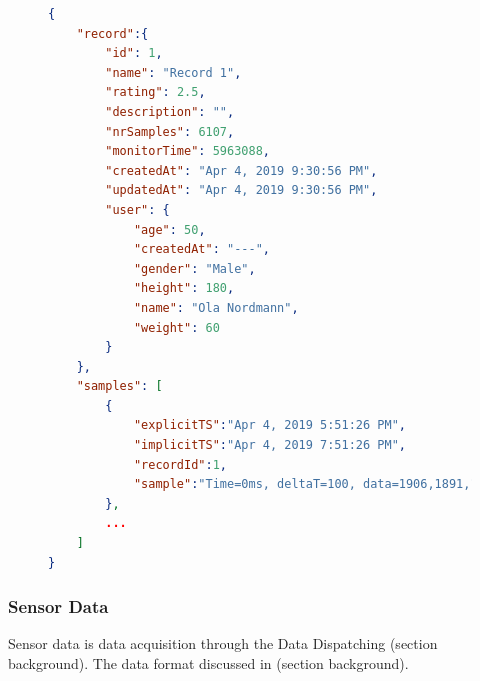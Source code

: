 \begin{figure}
    
\begin{lstlisting}[language=json, caption={My Caption}, captionpos=b]
{
    "record":{  
        "id": 1,
        "name": "Record 1",
        "rating": 2.5,
        "description": "",
        "nrSamples": 6107,
        "monitorTime": 5963088,
        "createdAt": "Apr 4, 2019 9:30:56 PM",
        "updatedAt": "Apr 4, 2019 9:30:56 PM",
        "user": {  
            "age": 50,
            "createdAt": "---",
            "gender": "Male",
            "height": 180,
            "name": "Ola Nordmann",
            "weight": 60
        }
    },
    "samples": [  
        {  
            "explicitTS":"Apr 4, 2019 5:51:26 PM",
            "implicitTS":"Apr 4, 2019 7:51:26 PM",
            "recordId":1,
            "sample":"Time=0ms, deltaT=100, data=1906,1891,1884,1881,1876,1718,1690"
        },
        ...
    ]
}
\end{lstlisting}
\end{figure}

\subsubsection{Sensor Data}
Sensor data is data acquisition through the Data Dispatching (section background). The data format discussed in (section background). 